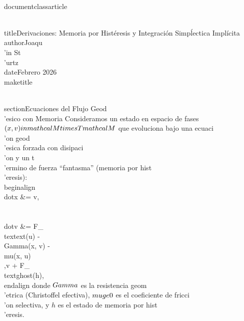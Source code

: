 \\documentclass{article}
\begin{document}
\\title{Derivaciones: Memoria por Histéresis y Integración Simpĺectica Implícita}
\\author{Joaqu\\'in St\\'urtz}
\\date{Febrero 2026}
\\maketitle

\\section{Ecuaciones del Flujo Geod\\'esico con Memoria}
Consideramos un estado en espacio de fases $(x, v) \\in \\mathcal{M} \\times T\\mathcal{M}$ que evoluciona bajo una ecuaci\\'on geod\\'esica forzada con disipaci\\'on y un t\\'ermino de fuerza ``fantasma'' (memoria por hist\\'eresis):
\\begin{align}
\\dot{x} &= v,\\\\
\\dot{v} &= F_{\\text{ext}}(u) - \\Gamma(x, v) - \\mu(x, u)\\,v + F_{\\text{ghost}}(h),
\\end{align}
donde $\\Gamma$ es la resistencia geom\\'etrica (Christoffel efectiva), $\\mu \\ge 0$ es el coeficiente de fricci\\'on selectiva, y $h$ es el estado de memoria por hist\\'eresis.
\end{document}
